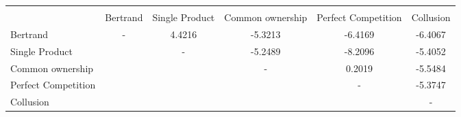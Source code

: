 \begin{tabular}{l c c c c c}\toprule \\
                    &    Bertrand&Single Product&Common ownership&Perfect Competition&   Collusion\\
\midrule
Bertrand            &       -&      4.4216&     -5.3213&     -6.4169&     -6.4067\\
Single Product      &            &       -&     -5.2489&     -8.2096&     -5.4052\\
Common ownership    &            &            &       -&      0.2019&     -5.5484\\
Perfect Competition &            &            &            &       -&     -5.3747\\
Collusion           &            &            &            &            &       -\\
\bottomrule\end{tabular}
